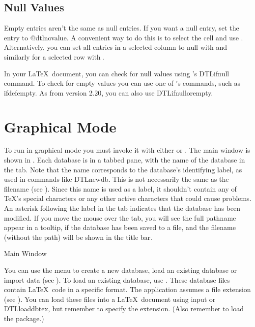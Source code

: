\section{Null Values}\label{null}

Empty entries aren't the same as null entries. If you want 
a null entry, set the entry to \gls{@dtlnovalue}. 
A convenient way to do this is to select the cell and use
. Alternatively, you can set all entries in 
a selected column to null with 
and similarly for a selected row with .

In your \LaTeX\ document, you can check for null values using 
's \gls{DTLifnull} command. To check for empty 
values you can use one of 's commands, such as 
\gls{ifdefempty}. As from  version 2.20, you
can also use \gls{DTLifnullorempty}.

\chapter{Graphical Mode}\label{gui}

To run  in graphical mode you must invoke it with either 
 or . The main window
is shown in . Each database is
in a tabbed pane, with the name of the database in the
tab. Note that the name corresponds to the database's identifying
label, as used in commands like \gls{DTLnewdb}. This is 
not necessarily the same as the filename (see ). 
Since this name is used as a label, it shouldn't contain any of 
\TeX's special characters or any other active characters that could 
cause problems.  An asterisk \code{*} following the label in the tab 
indicates that the database has been modified. If you move the mouse
over the tab, you will see the full pathname appear in a tooltip,
if the database has been saved to a  file,
and the filename (without the path) will be shown in the title bar.

 {%
 }
 {Main Window}

 You can use the  menu to create a new 
database, load an existing database or import data (see 
). To load an existing database, use
. These database files contain \LaTeX\ code
in a specific format. The  application assumes 
a  file extension (see ).
You can load these files into a \LaTeX\ document using 
\gls{input} or \gls{DTLloaddbtex}, but remember to specify 
the  extension. (Also remember to load the 
 package.)

